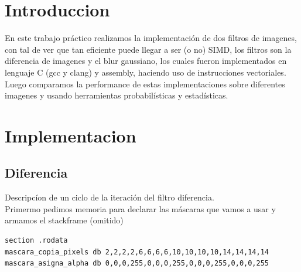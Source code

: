 \documentclass[a4paper]{article}
\begin{document}
\thispagestyle{empty}


\maketitle 

\tableofcontents

\newpage

\section{Introduccion}
En este trabajo práctico realizamos la implementación de dos filtros de imagenes, con tal de ver que tan eficiente puede llegar a ser (o no) SIMD, los filtros son la diferencia de imagenes y el blur gaussiano, los cuales fueron implementados en lenguaje C (gcc y clang) y assembly, haciendo uso de instrucciones vectoriales. Luego comparamos la performance de estas implementaciones sobre diferentes imagenes y usando herramientas probabilísticas y estadísticas.

\section{Implementacion}

\subsection{Diferencia}
 Descripcíon de un ciclo de la iteración del filtro diferencia.\\
Primermo pedimos memoria para declarar las máscaras que vamos a usar y armamos el stackframe (omitido)
\begin{codesnippet}
\begin{verbatim}
section .rodata
mascara_copia_pixels db 2,2,2,2,6,6,6,6,10,10,10,10,14,14,14,14
mascara_asigna_alpha db 0,0,0,255,0,0,0,255,0,0,0,255,0,0,0,255
\end{verbatim}
\end{codesnippet}
\end{document}
